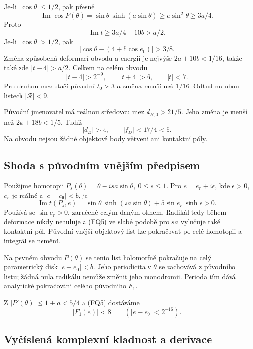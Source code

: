 \documentclass[11pt,a4paper]{article}
\theoremstyle{remark}\newtheorem{remark}[theorem]{Poznámka}
\numberwithin{equation}{section}
\begin{document}
Je-li \(|\cos\theta|\le1/2\), pak přesně \[
\operatorname{Im}\cos P(\theta)
=\sin\theta\,\sinh(a\sin\theta)\ge a\sin^2\theta\ge3a/4.
\] Proto \[
\operatorname{Im}t\ge3a/4-10b>a/2.
\] Je-li \(|\cos\theta|>1/2\), pak \[
|\cos\theta-(4+5\cos e_0)|>3/8.
\] Změna způsobená deformací obvodu a energií je nejvýše
\(2a+10b<1/16\), takže také zde \(|t-4|>a/2\). Celkem na celém obvodu \[
\boxed{|t-4|>2^{-9},\qquad |t+4|>6,\qquad |t|<7.}
\tag{FQ4}
\] Pro druhou mez stačí původní \(t_0>3\) a změna menší než \(1/16\).
Odtud na obou listech \(|\mathcal R|<9\).

Původní jmenovatel má reálnou středovou mez \(d_{B,0}>21/5\). Jeho změna
je menší než \(2a+18b<1/5\). Tudíž \[
\boxed{|d_B|>4,\qquad |f_B|<17/4<5.}
\tag{FQ5}
\] Na obvodu nejsou žádné objektové body větvení ani kontaktní póly.

\hypertarget{shoda-s-pux16fvodnuxedm-vnux11bjux161uxedm-pux159edpisem}{%
\subsection{Shoda s původním vnějším
předpisem}\label{shoda-s-pux16fvodnuxedm-vnux11bjux161uxedm-pux159edpisem}}

Použijme homotopii \(P_s(\theta)=\theta-isa\sin\theta,\ 0\le s\le1\).
Pro \(e=e_r+i\epsilon\), kde \(\epsilon>0\), \(e_r\) je reálné a
\(|e-e_0|<b\), je \[
\operatorname{Im}t(P_s,e)
=\sin\theta\,\sinh(sa\sin\theta)
+5\sin e_r\,\sinh\epsilon>0.
\tag{FQ6}
\] Používá se \(\sin e_r>0\), zaručené celým daným oknem. Radikál tedy
během deformace nikdy nenuluje a (FQ5) ve slabé podobě pro \(sa\)
vylučuje také kontaktní pól. Původní vnější objektový list lze
pokračovat po celé homotopii a integrál se nemění.

Na pevném obvodu \(P(\theta)\) se tento list holomorfně pokračuje na
celý parametrický disk \(|e-e_0|<b\). Jeho periodicita v \(\theta\) se
zachovává z původního listu; žádná nula radikálu nemůže změnit jeho
monodromii. Perioda tím dává analytické pokračování celého původního
\(F_1\).

Z \(|P'(\theta)|\le1+a<5/4\) a (FQ5) dostáváme \[
\boxed{|F_1(e)|<8\qquad(|e-e_0|<2^{-16}).}
\tag{FQ7}
\]

\hypertarget{vyux10duxedslenuxe1-komplexnuxed-kladnost-a-derivace}{%
\subsection{Vyčíslená komplexní kladnost a
derivace}\label{vyux10duxedslenuxe1-komplexnuxed-kladnost-a-derivace}}
\end{document}
